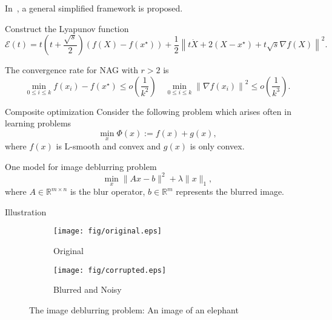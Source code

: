 \documentclass[10pt]{beamer}
\begin{document}
\begin{frame}
  In~\citet{chen2022gradient}, a general simplified framework is proposed. \par 
  
  Construct the Lyapunov function
  \begin{equation*}
    \mathcal{E}(t) = t\left(t+\frac{\sqrt{s}}{2}\right)(f(X) - f(x^\star)) + \frac{1}{2}\left\|t\dot{X} + 2(X - x^\star) + t\sqrt{s}\nabla f(X)\right\|^2.
  \end{equation*}

  The convergence rate for NAG with $r > 2$ is
  \begin{equation*}
    \min_{0\le i \le k}f(x_i) - f(x^\star) \le o\left( \frac{1}{k^2} \right) \quad \min_{0\le i \le k}\left\| \nabla f(x_i) \right\|^2 \le o\left( \frac{1}{k^3} \right).
  \end{equation*}
\end{frame}

\begin{frame}{Composite optimization}
  Consider the following problem which arises often in learning problems
  \begin{equation}\label{compro}
    \min_x \Phi(x):= f(x) + g(x),
  \end{equation}
  where $f(x)$ is L-smooth and convex and $g(x)$ is only convex. \par
  \pause
  One model for image deblurring problem
  \begin{equation*}
    \min_x \|Ax - b\|^2 + \lambda\|x\|_1,
  \end{equation*}
  where $A\in\mathbb{R}^{m\times n}$ is the blur operator, $b\in\mathbb{R}^m$ represents the blurred image.
\end{frame}

\begin{frame}{Illustration}
  \begin{figure}[htpb!]
    \centering
    \begin{subfigure}[t]{0.48\linewidth}
    \centering
    \texttt{[image: fig/original.eps]}
    \caption{Original}
    \end{subfigure}
    \begin{subfigure}[t]{0.48\linewidth}
    \centering
    \texttt{[image: fig/corrupted.eps]}
    \caption{Blurred and Noisy}
    \end{subfigure}
    \caption{The image deblurring problem: An image of an elephant}
    \label{fig: deblurring}
    \end{figure}
\end{frame}
\end{document}
